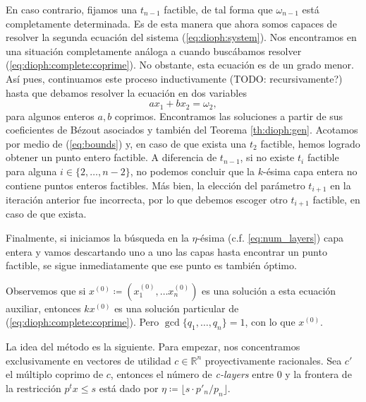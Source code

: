 \documentclass[11pt]{article}
\begin{document}
En caso contrario, fijamos una $t_{n-1}$ factible, de tal forma que $\omega_{n-1}$ está
completamente determinada. Es de esta manera que ahora somos capaces de resolver la segunda ecuación
del sistema (\ref{eq:dioph:system}). Nos encontramos en una situación completamente análoga a cuando
buscábamos resolver (\ref{eq:dioph:complete:coprime}). No obstante, esta ecuación es de un grado
menor. Así pues, continuamos este proceso inductivamente (TODO: recursivamente?) hasta que debamos
resolver la ecuación en dos variables
\begin{equation*}
	ax_1 + bx_2 = \omega_2,
\end{equation*}
para algunos enteros $a, b$ coprimos. Encontramos las soluciones a partir de sus coeficientes de
Bézout asociados y también del Teorema \ref{th:dioph:gen}. Acotamos por medio de (\ref{eq:bounds})
y, en caso de que exista una $t_2$ factible, hemos logrado obtener un punto entero factible. A
diferencia de $t_{n - 1}$, si no existe $t_i$ factible para alguna $i \in \{2, \ldots, n - 2\}$, no
podemos concluir que la $k$-ésima capa entera no contiene puntos enteros factibles. Más bien, la
elección del parámetro $t_{i + 1}$ en la iteración anterior fue incorrecta, por lo que debemos
escoger otro $t_{i + 1}$ factible, en caso de que exista.

Finalmente, si iniciamos la búsqueda en la $\eta$-ésima (c.f. \ref{eq:num_layers}) capa entera y
vamos descartando uno a uno las capas hasta encontrar un punto factible, se sigue inmediatamente que
ese punto es también óptimo.


Observemos que si $x^{(0)} \coloneq (x_1^{(0)}, \ldots x_n^{(0)})$ es una solución a esta ecuación
auxiliar, entonces $kx^{(0)}$ es una solución particular de (\ref{eq:dioph:complete:coprime}). Pero
$\gcd\lbrace q_1, \ldots, q_n \rbrace = 1$, con lo que $x^{(0)}$.

La idea del método es la siguiente. Para empezar, nos concentramos exclusivamente en vectores de
utilidad $c \in \mathbb{R}^n$ proyectivamente racionales. Sea $c'$ el múltiplo coprimo de $c$,
entonces el número de \textit{c-layers} entre 0 y la frontera de la restricción $p^tx \leq s$ está
dado por $\eta \coloneq \lfloor s \cdot p'_n / p_n \rfloor$.
\end{document}

